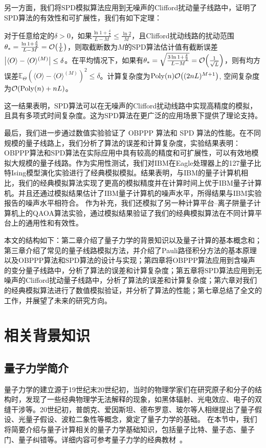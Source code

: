 另一方面，我们将SPD模拟算法应用到无噪声的Clifford扰动量子线路中，证明了SPD算法的有效性和可扩展性，我们有如下定理：
\begin{theorem}[非正式]
    对于任意给定的$\delta>0$，如果$\frac{\ln{1+\frac{\delta}{2}}}{L-M}\leq \frac{\ln{2}}{M}$，且Clifford扰动线路的扰动范围$\theta_*=\frac{\ln{1+\frac{\delta}{2}}}{L-M}=\order{\frac{1}{L}}$，则取截断数为$M$的SPD算法估计值有截断误差$\abs{\langle O \rangle - \langle O \rangle ^{(M)}}\leq \delta$。在平均情况下，如果有$\theta_*=\sqrt{\frac{3\ln{1+\frac{\delta}{2}}}{L-M}}=\order{\frac{1}{\sqrt{L}}}$，则有均方误差$\mathbb{E}_{\Theta}\left(\langle O \rangle - \langle O \rangle ^{(M)}\right)^2 \leq \delta$。计算复杂度为$\mathrm{Poly}(n) \order{(2nL)^{M+1}}$, 空间复杂度为$\order{\mathrm{Poly}(n)+nL}$。
\end{theorem}

这一结果表明，SPD算法可以在无噪声的Clifford扰动线路中实现高精度的模拟，且具有多项式时间复杂度。这为SPD算法在更广泛的应用场景下提供了理论支持。

最后，我们进一步通过数值实验验证了 OBPPP 算法和 SPD 算法的性能。在不同规模的量子线路上，我们分析了算法的误差和计算复杂度，实验结果表明：OBPPP算法和SPD算法在实际应用中具有较高的精度和可扩展性，可以有效地模拟大规模的量子线路。作为实用性测试，我们对IBM在Eagle处理器上的127量子比特Ising模型演化实验进行了经典模拟模拟。结果表明，与IBM的量子计算机相比，我们的经典模拟算法实现了更高的模拟精度并在计算时间上优于IBM量子计算机。并且还通过模拟结果估计了IBM量子计算机的噪声水平，所得结果与IBM实验报告的噪声水平相符合。
作为补充，我们还模拟了另一种计算平台--离子阱量子计算机上的QAOA算法实验，通过模拟结果验证了我们的经典模拟算法在不同计算平台上的通用性和有效性。

本文的结构如下：第二章介绍了量子力学的背景知识以及量子计算的基本概念和；第三章介绍了常见的量子线路模拟方法，并介绍了Pauli路径积分方法的基本原理以及OBPPP算法和SPD算法的设计与实现；第四章将OBPPP算法应用到含噪声的变分量子线路中，分析了算法的误差和计算复杂度；第五章将SPD算法应用到无噪声的Clifford扰动量子线路中，分析了算法的误差和计算复杂度；第六章对我们的经典模拟算法进行了数值模拟验证，并分析了算法的性能；第七章总结了全文的工作，并展望了未来的研究方向。

\chapter{相关背景知识}




\section{量子力学简介}
量子力学的建立源于19世纪末20世纪初，当时的物理学家们在研究原子和分子的结构时，发现了一些经典物理学无法解释的现象，如黑体辐射、光电效应、电子的双缝干涉等。20世纪初，普朗克、爱因斯坦、德布罗意、玻尔等人相继提出了量子假设、光量子假设、波粒二象性等概念，奠定了量子力学的基础。
在本节中，我们将简要介绍与量子计算相关的量子力学基础知识，包括量子比特、量子态、量子门、量子纠错等。详细内容可参考量子力学的经典教材~\cite{griffiths2018introduction,messiah2014quantum}。

